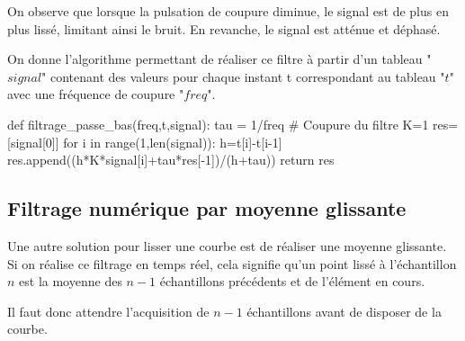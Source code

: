 On observe que lorsque la pulsation de coupure diminue, le signal est de plus en plus lissé, limitant ainsi le bruit. En revanche, le signal est atténue et déphasé. 




On donne l'algorithme permettant de réaliser ce filtre à partir d'un tableau "$signal$" contenant des valeurs pour chaque instant t correspondant au tableau "$t$" avec une fréquence de coupure "$freq$".

\begin{pyverbatim}
def filtrage_passe_bas(freq,t,signal):
    tau = 1/freq # Coupure du filtre
    K=1
    res=[signal[0]]
    for i in range(1,len(signal)):
        h=t[i]-t[i-1]
        res.append((h*K*signal[i]+tau*res[-1])/(h+tau))
    return res
\end{pyverbatim}

\subsection{Filtrage numérique par moyenne glissante}
Une autre solution pour lisser une courbe est de réaliser une moyenne glissante. Si on réalise ce filtrage en temps réel, cela signifie qu'un point lissé à l'échantillon $n$ est la moyenne des $n-1$ échantillons précédents et de l'élément en cours. 

Il faut donc attendre l'acquisition de $n-1$ échantillons avant de disposer de la courbe.


%

